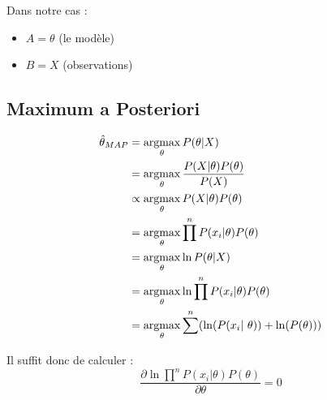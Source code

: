 \documentclass{article}
\begin{document}
Dans notre cas :
\begin{itemize}
    \item $A = \theta$ (le modèle)
    \item $B = X$ (observations)
\end{itemize}


\subsection{Maximum a Posteriori}

\begin{align*}
    \hat\theta_{MAP} & = \argmax\limits_{\theta} P(\theta | X) \\
    & = \argmax\limits_{\theta} \frac{P(X | \theta)P(\theta)}{P(X)} \\
    & \propto \argmax\limits_{\theta} P(X | \theta)P(\theta) \\
    & = \argmax\limits_{\theta} \prod\limits^n P(x_i | \theta)P(\theta) \\
    & = \argmax\limits_{\theta} \ln P(\theta | X) \\
    & = \argmax\limits_{\theta} \ln \prod\limits^n P(x_i | \theta)P(\theta) \\
    & = \argmax\limits_{\theta} \sum\limits^n (\ln(P(x_i | \theta)) + \ln(P(\theta)))
\end{align*}

Il suffit donc de calculer : 
\begin{equation*}
    \frac{
        \partial \ln \prod\limits^n P(x_i | \theta)P(\theta)
    }{
        \partial \theta
    } = 0
\end{equation*}
\end{document}
